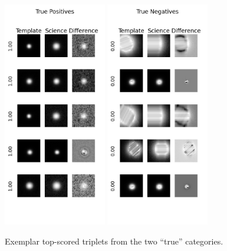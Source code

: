 \documentclass[DM,authoryear,toc]{lsstdoc}
\begin{document}
\clearpage
\begin{figure}[h]
  \centering
  \includegraphics[width=0.4\textwidth]{TP_13-resnet50-FullAugmentation-scratch-B64_epoch0000095_iter0255000__npy_data_0.1.2-0sigma_256by256__posw_1.png}
  \includegraphics[width=0.4\textwidth]{TN_13-resnet50-FullAugmentation-scratch-B64_epoch0000095_iter0255000__npy_data_0.1.2-0sigma_256by256__posw_1.png}
  \caption{Exemplar top-scored triplets from the two ``true'' categories.}
  \label{fig:tract_templates}
\end{figure}
\end{document}
